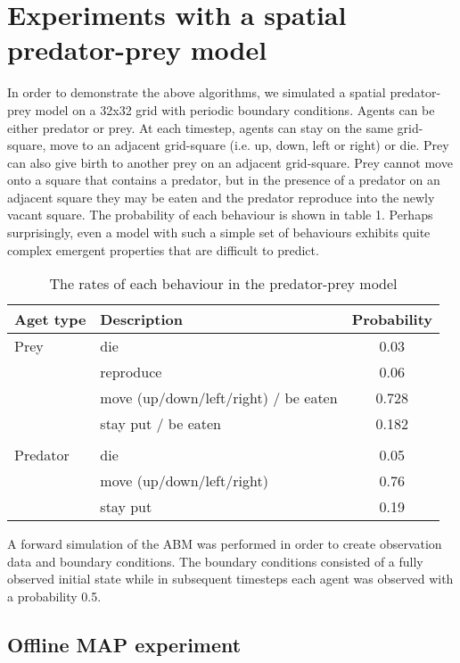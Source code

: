 \documentclass{article}
\begin{document}
\section{Experiments with a spatial predator-prey model}

In order to demonstrate the above algorithms, we simulated a spatial predator-prey model on a 32x32 grid with periodic boundary conditions. Agents can be either predator or prey. At each timestep, agents can stay on the same grid-square, move to an adjacent grid-square (i.e. up, down, left or right) or die. Prey can also give birth to another prey on an adjacent grid-square. Prey cannot move onto a square that contains a predator, but in the presence of a predator on an adjacent square they may be eaten and the predator reproduce into the newly vacant square. The probability of each behaviour is shown in table 1. Perhaps surprisingly, even a model with such a simple set of behaviours exhibits quite complex emergent properties that are difficult to predict.


\begin{table}
\begin{center}
\begin{tabular}{llc}
\hline
Aget type & Description & Probability\\
\hline
Prey & die &        0.03\\
 & reproduce &        0.06\\
 & move (up/down/left/right) / be eaten &        0.728\\
 & stay put / be eaten &  0.182 \\
 &&\\
Predator & die  &      0.05\\
 & move (up/down/left/right)&        0.76\\
 & stay put & 0.19\\
\hline
\end{tabular}
\end{center}
\caption{The rates of each behaviour in the predator-prey model}
\label{rates}
\end{table}



A forward simulation of the ABM was performed in order to create observation data and boundary conditions. The boundary conditions consisted of a fully observed initial state while in subsequent timesteps each agent was observed with a probability 0.5.

\subsection{Offline MAP experiment}
\end{document}
